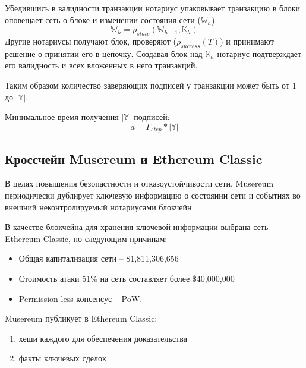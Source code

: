 \documentclass[12pt]{report}
\begin{document}
\begin{multicols}{2}
Убедившись в валидности транзакции нотариус упаковывает транзакцию в блоки оповещает сеть о блоке и изменении состояния сети ($\mathbb{W}_h$).
\begin{equation}
\mathbb{W}_h = \rho_{state}(\mathbb{W}_{h-1}, \mathbb{K}_h)
\end{equation}
Другие нотариусы получают блок, проверяют ($\rho_{success}(T)$) и принимают решение о принятии его в цепочку. Создавая блок над $\mathbb{K}_h$ нотариус подтверждает его валидность и всех вложенных в него транзакций.

Таким образом количество заверяющих подписей у транзакции может быть от 1 до $|\mathbb{Y}|$.

Минимальное время получения $|\mathbb{Y}|$ подписей:
\begin{equation}
a = \Gamma_{step} * |\mathbb{Y}|
\end{equation}
\end{multicols}

\subsection{Кроссчейн Musereum и Ethereum Classic}
\label{tech-blockchain-anchoring}
\begin{multicols}{2}
В целях повышения безопастности и отказоустойчивости сети, Musereum периодически дублирует ключевую информацию о состоянии сети и событиях во внешний неконтролируемый нотариусами блокчейн. 

В качестве блокчейна для хранения ключевой информации выбрана сеть Ethereum Classic, по следующим причинам:
\begin{itemize}
	\item Общая капитализация сети – \$1,811,306,656
	\item Стоимость атаки 51\% на сеть составляет более \$40,000,000
	\item Permission-less консенсус – PoW.
\end{itemize}

Musereum публикует в Ethereum Classic:
\begin{enumerate}
	\item хеши каждого для обеспечения доказательства
	\item факты ключевых сделок
\end{enumerate}
\end{multicols}
\end{document}
